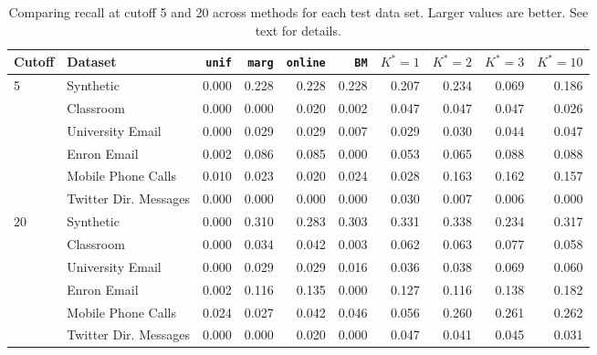 \begin{table}[t]
\begin{center}
{\footnotesize
\begin{tabular}{llrrrrrrrr}
  \hline
Cutoff & Dataset & \texttt{unif} & \texttt{marg} & \texttt{online} & \texttt{BM} & $K^*=1$ & $K^*=2$ & $K^*=3$ & $K^*=10$ \\ 
  \hline
5 & Synthetic & 0.000 & 0.228 & 0.228 & 0.228 & 0.207 & 0.234 & 0.069 & 0.186 \\ 
   & Classroom & 0.000 & 0.000 & 0.020 & 0.002 & 0.047 & 0.047 & 0.047 & 0.026 \\ 
   & University Email & 0.000 & 0.029 & 0.029 & 0.007 & 0.029 & 0.030 & 0.044 & 0.047 \\ 
   & Enron Email & 0.002 & 0.086 & 0.085 & 0.000 & 0.053 & 0.065 & 0.088 & 0.088 \\ 
   & Mobile Phone Calls & 0.010 & 0.023 & 0.020 & 0.024 & 0.028 & 0.163 & 0.162 & 0.157 \\ 
   & Twitter Dir. Messages & 0.000 & 0.000 & 0.000 & 0.000 & 0.030 & 0.007 & 0.006 & 0.000 \\ 
  20 & Synthetic & 0.000 & 0.310 & 0.283 & 0.303 & 0.331 & 0.338 & 0.234 & 0.317 \\ 
   & Classroom & 0.000 & 0.034 & 0.042 & 0.003 & 0.062 & 0.063 & 0.077 & 0.058 \\ 
   & University Email & 0.000 & 0.029 & 0.029 & 0.016 & 0.036 & 0.038 & 0.069 & 0.060 \\ 
   & Enron Email & 0.002 & 0.116 & 0.135 & 0.000 & 0.127 & 0.116 & 0.138 & 0.182 \\ 
   & Mobile Phone Calls & 0.024 & 0.027 & 0.042 & 0.046 & 0.056 & 0.260 & 0.261 & 0.262 \\ 
   & Twitter Dir. Messages & 0.000 & 0.000 & 0.020 & 0.000 & 0.047 & 0.041 & 0.045 & 0.031 \\ 
   \hline
\end{tabular}
}
\caption{Comparing recall at cutoff 5 and 20 across methods for each test data set.  Larger values are better.  See text for details.}
\label{tab:recall20}
\end{center}
\end{table}

